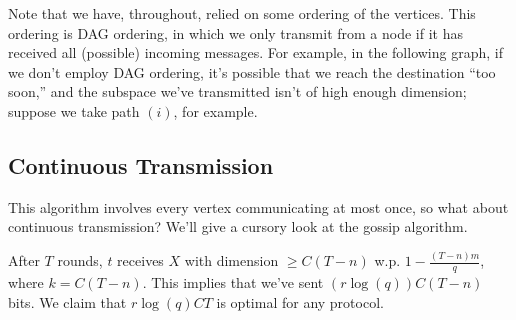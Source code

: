 \documentclass[11pt]{article}
\begin{document}
Note that we have, throughout, relied on some ordering of the vertices. This ordering is DAG ordering,
in which we only transmit from a node if it has received all (possible) incoming messages. For example, 
in the following graph, if we don't employ DAG ordering, it's possible that we reach the destination
``too soon,'' and the subspace we've transmitted isn't of high enough dimension; suppose we take path
$(i)$, for example.

\subsection{Continuous Transmission} 

This algorithm involves every vertex communicating at most once, so what about continuous transmission? 
We'll give a cursory look at the gossip algorithm. 

After $T$ rounds, $t$ receives $X$ with dimension $\geq C(T-n)$ w.p. $1 - \frac{(T - n)m}{q}$,
where $k = C(T-n)$. This implies that we've sent $(r\log(q))C(T-n)$ bits. We claim that $r\log(q)
CT$ is optimal for any protocol.
\end{document}
